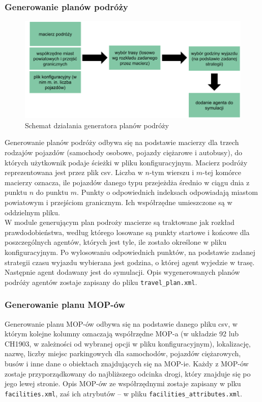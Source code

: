 \subsubsection{Generowanie planów podróży}
    \begin{figure}[h]
        \caption{Schemat działania generatora planów podróży}
        \includegraphics[width=\textwidth]{images/mopsim/mopsim-travelplan.png}
    \end{figure}
Generowanie planów podróży odbywa się na podstawie macierzy dla trzech rodzajów pojazdów (samochody osobowe, pojazdy ciężarowe i autobusy), do których użytkownik podaje ścieżki w pliku konfiguracyjnym. Macierz podróży reprezentowana jest przez plik csv. Liczba w $n$-tym wierszu i $m$-tej komórce macierzy oznacza, ile pojazdów danego typu przejeżdża średnio w ciągu dnia z punktu $n$ do punktu $m$. Punkty o odpowiednich indeksach odpowiadają miastom powiatowym i przejściom granicznym. Ich współrzędne umieszczone są w oddzielnym pliku.\\
W module generującym plan podroży macierze są traktowane jak rozkład prawdodobieństwa, według którego losowane są punkty startowe i końcowe dla poszczególnych agentów, których jest tyle, ile zostało określone w pliku konfiguracyjnym. Po wylosowaniu odpowiednich punktów, na podstawie zadanej strategii czasu wyjazdu wybierana jest godzina, o której agent wyjedzie w trasę. Następnie agent dodawany jest do symulacji. Opis wygenerowanych planów podróży agentów zostaje zapisany do pliku \texttt{travel\_plan.xml}.
\newpage
\subsubsection{Generowanie planu MOP-ów}
Generowanie planu MOP-ów odbywa się na podstawie danego pliku csv, w którym kolejne kolumny oznaczają współrzędne MOP-a (w układzie 92 lub CH1903, w zależności od wybranej opcji w pliku konfiguracyjnym), lokalizację, nazwę, liczby miejsc parkingowych dla samochodów, pojazdów ciężarowych, busów i inne dane o obiektach znajdujących się na MOP-ie. Każdy z MOP-ów zostaje przyporządkowany do najbliższego odcinka drogi, który znajduje się po jego lewej stronie. Opis MOP-ów ze współrzędnymi zostaje zapisany w plku \texttt{facilities.xml}, zaś ich atrybutów -- w pliku \texttt{facilities\_attributes.xml}.
